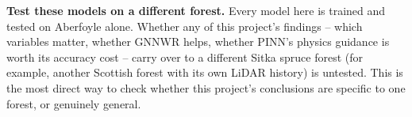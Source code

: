 \textbf{Test these models on a different forest.} Every model here is trained and tested on Aberfoyle alone. Whether any of this project's findings -- which variables matter, whether GNNWR helps, whether PINN's physics guidance is worth its accuracy cost -- carry over to a different Sitka spruce forest (for example, another Scottish forest with its own LiDAR history) is untested. This is the most direct way to check whether this project's conclusions are specific to one forest, or genuinely general.

